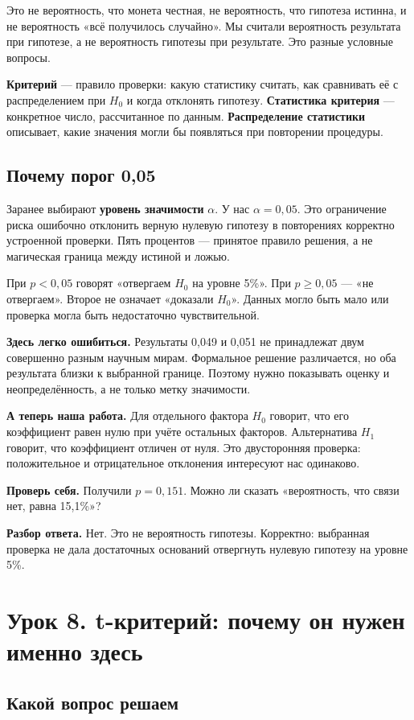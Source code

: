 \documentclass[12pt,a4paper]{article}
\newcommand{\ours}[1]{\par\textbf{А теперь наша работа.} #1\par}
\newcommand{\check}[2]{\par\textbf{Проверь себя.} #1\par\textbf{Разбор ответа.} #2\par}
\newcommand{\pitfall}[1]{\par\textbf{Здесь легко ошибиться.} #1\par}
\begin{document}
Это не вероятность, что монета честная, не вероятность, что гипотеза истинна, и не вероятность «всё получилось случайно». Мы считали вероятность результата при гипотезе, а не вероятность гипотезы при результате. Это разные условные вопросы.

\textbf{Критерий} --- правило проверки: какую статистику считать, как сравнивать её с распределением при $H_0$ и когда отклонять гипотезу. \textbf{Статистика критерия} --- конкретное число, рассчитанное по данным. \textbf{Распределение статистики} описывает, какие значения могли бы появляться при повторении процедуры.

\subsection{Почему порог 0,05}

Заранее выбирают \textbf{уровень значимости} $\alpha$. У нас $\alpha=0{,}05$. Это ограничение риска ошибочно отклонить верную нулевую гипотезу в повторениях корректно устроенной проверки. Пять процентов --- принятое правило решения, а не магическая граница между истиной и ложью.

При $p<0{,}05$ говорят «отвергаем $H_0$ на уровне 5\%». При $p\geq0{,}05$ --- «не отвергаем». Второе не означает «доказали $H_0$». Данных могло быть мало или проверка могла быть недостаточно чувствительной.

\pitfall{Результаты 0,049 и 0,051 не принадлежат двум совершенно разным научным мирам. Формальное решение различается, но оба результата близки к выбранной границе. Поэтому нужно показывать оценку и неопределённость, а не только метку значимости.}

\ours{Для отдельного фактора $H_0$ говорит, что его коэффициент равен нулю при учёте остальных факторов. Альтернатива $H_1$ говорит, что коэффициент отличен от нуля. Это двусторонняя проверка: положительное и отрицательное отклонения интересуют нас одинаково.}

\check{Получили $p=0{,}151$. Можно ли сказать «вероятность, что связи нет, равна 15,1\%»?}{Нет. Это не вероятность гипотезы. Корректно: выбранная проверка не дала достаточных оснований отвергнуть нулевую гипотезу на уровне 5\%.}

\section{Урок 8. t-критерий: почему он нужен именно здесь}

\subsection{Какой вопрос решаем}
\end{document}
